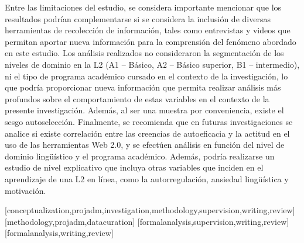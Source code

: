 \documentclass[spanish]{textolivre}
\begin{document}
Entre las limitaciones del estudio, se considera importante mencionar que los resultados podrían complementarse si se considera la inclusión de diversas herramientas de recolección de información, tales como entrevistas y videos que permitan aportar nueva información para la comprensión del fenómeno abordado en este estudio. Los análisis realizados no consideraron la segmentación de los niveles de dominio en la L2 (A1 – Básico, A2 – Básico superior, B1 – intermedio), ni el tipo de programa académico cursado en el contexto de la investigación, lo que podría proporcionar nueva información que permita realizar análisis más profundos sobre el comportamiento de estas variables en el contexto de la presente investigación. Además, al ser una muestra por conveniencia, existe el sesgo autoselección. Finalmente, se recomienda que en futuras investigaciones se analice si existe correlación entre las creencias de autoeficacia y la actitud en el uso de las herramientas Web 2.0, y se efectúen análisis en función del nivel de dominio lingüístico y el programa académico. Además, podría realizarse un estudio de nivel explicativo que incluya otras variables que inciden en el aprendizaje de una L2 en línea, como la autorregulación, ansiedad lingüística y motivación.



\printbibliography\label{sec-bib}
\begin{contributors}
[conceptualization,projadm,investigation,methodology,supervision,writing,review]
[methodology,projadm,datacuration]
[formalanalysis,supervision,writing,review]
[formalanalysis,writing,review]
\end{contributors}
\end{document}
